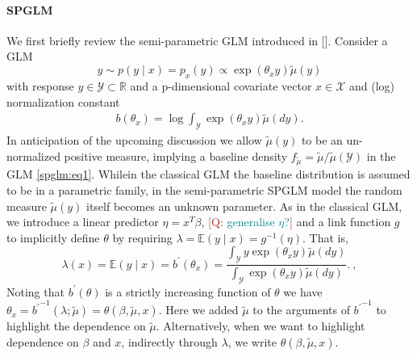 \documentclass{article}[12pt]
\newcommand{\RR}{\mathbb{R}}
\newcommand{\YY}{\mathcal{Y}}
\newcommand{\blau}{\color{blue}}
\newcommand{\citeab}[1]{\citeauthor{#1} [\href{cite.#1}{\textcolor{blue}{\citeyear{#1}}}]}  %
\newcommand{\Q}[1]{\textcolor{brown}{[Q: \textcolor{teal}{#1}]}}
\renewcommand{\th}{\theta}
\newcommand{\tmu}{\widetilde{\mu}}
\newcommand{\E}{\mathbb{E}}
\begin{document}
\paragraph*{\blau SPGLM}
We first briefly review the semi-parametric GLM introduced in
\citeab{rathouz2009generalized}. Consider a GLM
\begin{equation}
  y \sim p(y \mid x) = p_x(y) \propto \exp (\th_x y)\tmu(y) \label{spglm:eq1} 
\end{equation}
with response $y \in \YY \subset \RR$ and a
p-dimensional covariate vector $x \in \mathcal{X}$ and (log)
normalization constant 
\begin{eqnarray}
b(\th_x) = \log \int_{\YY} \exp (\th_x y) \tmu(dy). \label{spglm:eq2}   
\end{eqnarray}
In anticipation of the upcoming discussion we allow $\tmu(y)$ to
be an un-normalized positive measure, implying
a  baseline density $f_{\tmu} = \tmu/\tmu(\YY)$
in the GLM \eqref{spglm:eq1}. Whilein the classical GLM the baseline
distribution is assumed to be in a parametric family,
in the semi-parametric SPGLM model the random measure $\tmu(y)$
itself becomes an unknown parameter. As in the classical GLM, we introduce a linear predictor $\eta = x^T\beta$, \Q{generalise $\eta$?} and a link function $g$ to implicitly define $\th$ by requiring $\lambda = \E(y \mid x) = g^{-1}(\eta)$.
That is,  
\begin{equation}
\lambda(x) = \E(y \mid x) = b^{\prime}(\th_x) = \frac{\int_{\YY} y \exp (\th_x y) \tmu(dy)}{\int_{\YY} \exp (\th_x y) \tmu(dy)}. \ ,\label{spglm:eq3}
\end{equation}
Noting that $b^{\prime}(\theta)$  is a strictly increasing
function of $\theta$ we have
$\th_x = {b^\prime}^{-1}(\lambda; \tmu)=\theta(\beta, \tmu, x)$. Here
we added $\tmu$ to the arguments of ${b^\prime}^{-1}$ to highlight the
dependence on $\tmu$. Alternatively, when we want to highlight
dependence on $\beta$ and $x$, indirectly through $\lambda$, we write
$\th(\beta, \tmu, x)$. 
\end{document}
